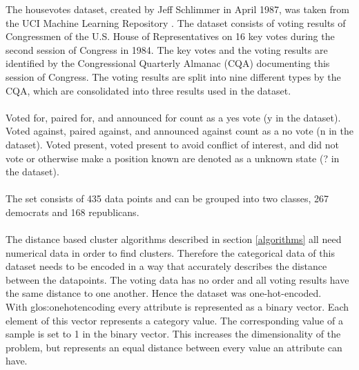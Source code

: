 
The housevotes dataset, created by Jeff Schlimmer in April 1987, was taken from the UCI Machine Learning Repository \cite{Dua2019}. The dataset consists of voting results of Congressmen of the U.S. House of Representatives on 16 key votes during the second session of Congress in 1984. The key votes and the voting results are identified by the Congressional Quarterly Almanac (CQA) documenting this session of Congress. The voting results are split into nine different types by the CQA, which are consolidated into three results used in the dataset.\\
\ \\
Voted for, paired for, and announced for count as a yes vote (y in the dataset).
Voted against, paired against, and announced against count as a no vote (n in the dataset).
Voted present, voted present to avoid conflict of interest, and did not vote or otherwise make a position known are denoted as a unknown state (? in the dataset).\\
\ \\
The set consists of 435 data points and can be grouped into two classes, 267 democrats and 168 republicans.\\
\ \\
The distance based cluster algorithms described in section \ref{algorithms} all need numerical data in order to find clusters. Therefore the categorical data of this dataset needs to be encoded in a way that accurately describes the distance between the datapoints. The voting data has no order and all voting results have the same distance to one another. Hence the dataset was one-hot-encoded.\\
With \Gls{glos:onehotencoding} every attribute is represented as a binary vector. Each element of this vector represents a category value. The corresponding value of a sample is set to 1 in the binary vector. 
This increases the dimensionality of the problem, but represents an equal distance between every value an attribute can have.\\

